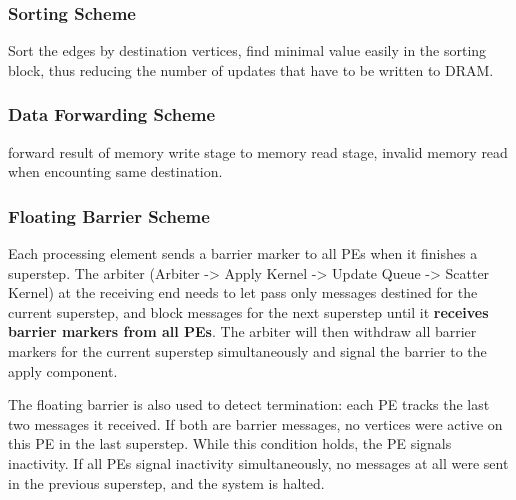 \documentclass[UTF8,12pt,a4paper]{article}
\begin{document}
\subsubsection{Sorting Scheme}
Sort the edges by destination vertices, find minimal value easily in the sorting block,
thus reducing the number of updates that have to be written to DRAM.
\subsubsection{Data Forwarding Scheme}
forward result of memory write stage to memory read stage,
invalid memory read when encounting same destination.
\subsubsection{Floating Barrier Scheme}
\label{ssub:floating barrier scheme}
Each processing element sends a barrier marker to
all PEs when it finishes a superstep.
The arbiter (Arbiter -> Apply Kernel -> Update Queue -> Scatter Kernel)
at the receiving end needs to
let pass only messages destined for the current superstep,
and block messages for the next superstep until it \textbf{receives barrier markers from all PEs}.
The arbiter will then withdraw all barrier markers for the current superstep simultaneously
and signal the barrier to the apply component.

The floating barrier is also used to detect termination:
each PE tracks the last two messages it received.
If both are barrier messages, no vertices were active on this PE in the last superstep.
While this condition holds, the PE signals inactivity.
If all PEs signal inactivity simultaneously,
no messages at all were sent in the previous superstep,
and the system is halted.

\clearpage



\newpage
\end{document}
